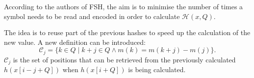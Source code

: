 According to the authors of \acs{FSH}, the aim is to minimise the number of times a symbol needs to be read and encoded in order to calculate $\mathcal{H}(x, Q)$.


The idea is to reuse part of the previous hashes to speed up the calculation of the new value. A new definition can be introduced: \[ \mathcal{C}_j = \{ k \in Q \; | \; k + j \in Q \wedge m(k) = m(k + j) - m(j) \}. \] $\mathcal{C}_j$ is the set of positions that can be retrieved from the previously calculated $h(x[i - j + Q])$ when $h(x[i + Q])$ is being calculated.

